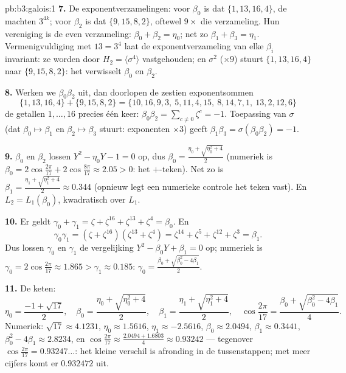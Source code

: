 \begin{solution}{pb:b3:galois:1}
\textbf{7.} De exponentverzamelingen: voor $\beta_0$ is dat $\{1,
13, 16, 4\}$, de machten $3^{4k}$; voor $\beta_2$ is dat $\{9, 15,
8, 2\}$, oftewel $9 \times$ die verzameling. Hun vereniging is de
even verzameling: $\beta_0 + \beta_2 = \eta_0$; net zo $\beta_1 +
\beta_3 = \eta_1$. Vermenigvuldiging met $13 = 3^4$ laat de
exponentverzameling van elke $\beta_i$ invariant: ze worden door
$H_2 = \langle\sigma^4\rangle$ vastgehouden; en $\sigma^2$
($\times 9$) stuurt $\{1,13,16,4\}$ naar $\{9, 15, 8, 2\}$: het
verwisselt $\beta_0$ en $\beta_2$.

\textbf{8.} Werken we $\beta_0\beta_2$ uit, dan doorlopen de
zestien exponentsommen
\[
\{1,13,16,4\} + \{9,15,8,2\} =
\{10,16,9,3,\ 5,11,4,15,\ 8,14,7,1,\ 13,2,12,6\}
\]
de getallen $1, \dots, 16$ precies één keer: $\beta_0\beta_2 =
\sum_{c\ne0}\zeta^c = -1$. Toepassing van $\sigma$ (dat $\beta_0
\mapsto \beta_1$ en $\beta_2 \mapsto \beta_3$ stuurt: exponenten
$\times 3$) geeft $\beta_1\beta_3 = \sigma(\beta_0\beta_2) = -1$.

\textbf{9.} $\beta_0$ en $\beta_2$ lossen $Y^2 - \eta_0 Y - 1 = 0$
op, dus $\beta_0 = \frac{\eta_0 + \sqrt{\eta_0^2 + 4}}2$ (numeriek
is $\beta_0 = 2\cos\frac{2\pi}{17} + 2\cos\frac{8\pi}{17} \approx
2.05 > 0$: het $+$-teken). Net zo is $\beta_1 = \frac{\eta_1 +
\sqrt{\eta_1^2 + 4}}2 \approx 0.344$ (opnieuw legt een numerieke
controle het teken vast). En $L_2 = L_1(\beta_0)$, kwadratisch
over $L_1$.

\textbf{10.} Er geldt $\gamma_0 + \gamma_1 = \zeta + \zeta^{16} +
\zeta^{13} + \zeta^4 = \beta_0$. En
\[
\gamma_0\gamma_1 = (\zeta + \zeta^{16})(\zeta^{13} + \zeta^4)
= \zeta^{14} + \zeta^{5} + \zeta^{12} + \zeta^{3} = \beta_1 .
\]
Dus lossen $\gamma_0$ en $\gamma_1$ de vergelijking $Y^2 -
\beta_0Y + \beta_1 = 0$ op; numeriek is $\gamma_0 =
2\cos\frac{2\pi}{17} \approx 1.865 > \gamma_1 \approx 0.185$:
$\gamma_0 = \frac{\beta_0 + \sqrt{\beta_0^2 - 4\beta_1}}2$.

\textbf{11.} De keten:
\[
\eta_0 = \frac{-1 + \sqrt{17}}2,
\quad
\beta_0 = \frac{\eta_0 + \sqrt{\eta_0^2 + 4}}2,
\quad
\beta_1 = \frac{\eta_1 + \sqrt{\eta_1^2 + 4}}2,
\quad
\cos\frac{2\pi}{17} = \frac{\beta_0 + \sqrt{\beta_0^2 -
4\beta_1}}4 .
\]
Numeriek: $\sqrt{17} \approx 4.1231$, $\eta_0 \approx 1.5616$,
$\eta_1 \approx -2.5616$, $\beta_0 \approx 2.0494$, $\beta_1
\approx 0.3441$, $\beta_0^2 - 4\beta_1 \approx 2.8234$, en
$\cos\frac{2\pi}{17} \approx \frac{2.0494 + 1.6803}4 \approx
0.93242$ --- tegenover $\cos\frac{2\pi}{17} = 0.93247\dots$: het
kleine verschil is afronding in de tussenstappen; met meer cijfers
komt er $0.932472$ uit.


\end{solution}
